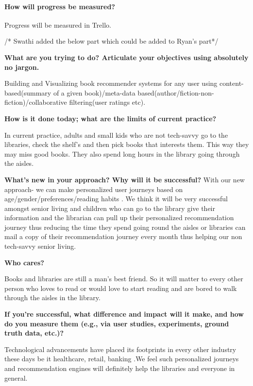 \paragraph{How will progress be measured?}Progress will be measured in Trello.





/* Swathi added the below part which could be added to Ryan's part*/

\textbf{What are you trying to do? Articulate your objectives using absolutely no jargon.}
 
    Building and Visualizing  book recommender systems for any user using content-based(summary of a given book)/meta-data 
    based(author/fiction-non-fiction)/collaborative filtering(user ratings etc).
 
\textbf{How is it done today; what are the limits of current practice?}
 
    In current practice, adults and small kids who are not tech-savvy go to the libraries, check the shelf's and then pick books that interests them.
    This way they may miss good books. They also spend long hours in the library going through the aisles.
 
\textbf{What's new in your approach? Why will it be successful?
 }
     With our new approach- we can make personalized user journeys based on age/gender/preferences/reading habits .
     We think it will be very successful amongst senior living and children who can go to the library give their information and the librarian can pull up their personalized recommendation journey thus reducing the time they spend going round the aisles or libraries can mail a copy of their recommendation journey every month thus helping our non tech-savvy senior living.

\textbf{Who cares?}
 
    Books and libraries are still a man's  best friend.  So it will matter to every other person who loves to read  or would love to start reading and are bored to walk through the aisles in the library.
    

\textbf{ If you're successful, what difference and impact will it make, and how do you measure them (e.g., via user studies, experiments, ground truth data, etc.)?}
 
    Technological advancements have placed its footprints in every other industry these days be it healthcare, retail, banking .We feel such personalized journeys and recommendation engines will definitely help the libraries and everyone in general.

